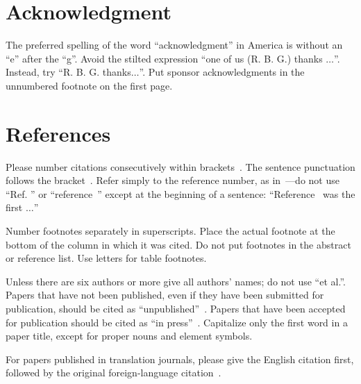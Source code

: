 \documentclass[conference]{IEEEtran}
\begin{document}
    \section*{Acknowledgment}

    The preferred spelling of the word ``acknowledgment'' in America is without an ``e'' after the ``g''.
    Avoid the stilted expression ``one of us (R. B. G.) thanks $\ldots$''.
    Instead, try ``R. B. G. thanks$\ldots$''.
    Put sponsor acknowledgments in the unnumbered footnote on the first page.

    \section*{References}

    Please number citations consecutively within brackets~\cite{b1}.
    The sentence punctuation follows the bracket~\cite{b2}.
    Refer simply to the reference number, as in~\cite{b3}---do not use ``Ref. \cite{b3}'' or ``reference~\cite{b3}'' except at the beginning of a sentence: ``Reference~\cite{b3} was the first $\ldots$''

    Number footnotes separately in superscripts.
    Place the actual footnote at
    the bottom of the column in which it was cited.
    Do not put footnotes in the abstract or reference list.
    Use letters for table footnotes.

    Unless there are six authors or more give all authors' names; do not use ``et al.''.
    Papers that have not been published, even if they have been submitted for publication, should be cited as ``unpublished''~\cite{b4}.
    Papers that have been accepted for publication should be cited as ``in press''~\cite{b5}.
    Capitalize only the first word in a paper title, except for proper nouns and element symbols.

    For papers published in translation journals, please give the English
    citation first, followed by the original foreign-language citation~\cite{b6}.
\end{document}
